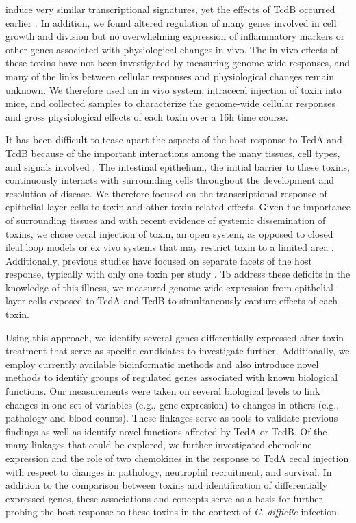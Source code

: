 induce very similar transcriptional signatures, yet the effects of TcdB 
occurred earlier \cite{DAuria:2012bd}. In addition, we found altered 
regulation of many genes involved in cell growth and division but no 
overwhelming expression of inflammatory markers or other genes associated 
with physiological changes in vivo. The in vivo effects of these toxins 
have not been investigated by measuring genome-wide responses, and many 
of the links between cellular responses and physiological changes remain 
unknown. We therefore used an in vivo system, intracecal injection of toxin 
into mice, and collected samples to characterize the genome-wide cellular 
responses and gross physiological effects of each toxin over a 16h time course.

It has been difficult to tease apart the aspects of the host response to TcdA 
and TcdB because of the important interactions among the many tissues, cell 
types, and signals involved \cite{Sun:2010kt,Madan:2012kp}. The intestinal 
epithelium, the initial barrier to these toxins, continuously interacts 
with surrounding cells throughout the development and resolution of disease. 
We therefore focused on the transcriptional response of epithelial-layer 
cells to toxin and other toxin-related effects. Given the importance of 
surrounding tissues and with recent evidence of systemic dissemination of 
toxins, we chose cecal injection of toxin, an open system, as opposed to 
closed ileal loop models or ex vivo systems that may restrict toxin to a 
limited area \cite{Steele:2012ft}. Additionally, previous studies have 
focused on separate facets of the host response, typically with only one 
toxin per study 
\cite{Morteau:2002ts,Kelly:1994cu,Kokkotou:2009ik,Ishida:2004ta,Castagliuolo:1998um,Warny:2000ct,Alcantara:2005dt}. 
To address these deficits in the knowledge of this illness, we measured 
genome-wide expression from epithelial-layer cells exposed to TcdA and 
TcdB to simultaneously capture effects of each toxin.

Using this approach, we identify several genes differentially expressed 
after toxin treatment that serve as specific candidates to investigate 
further. Additionally, we employ currently available bioinformatic methods 
and also introduce novel methods to identify groups of regulated genes 
associated with known biological functions. Our measurements were taken 
on several biological levels to link changes in one set of variables 
(e.g., gene expression) to changes in others (e.g., pathology and blood counts). 
These linkages serve as tools to validate previous findings as well as 
identify novel functions affected by TcdA or TcdB. Of the many linkages 
that could be explored, we further investigated chemokine expression and 
the role of two chemokines in the response to TcdA cecal injection with 
respect to changes in pathology, neutrophil recruitment, and survival. 
In addition to the comparison between toxins and identification of differentially 
expressed genes, these associations and concepts serve as a basis for 
further probing the host response to these toxins in the context of 
\textit{C. difficile} infection.

